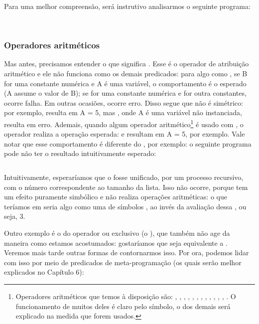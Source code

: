 \documentclass{article}
\begin{document}
Para uma melhor compreensão, será instrutivo analisarmos o seguinte programa:
\\
\\

\inputminted{prolog}{../Exemplos/Cap3/prog2_length.pl}\label{lst:length}

\subsubsection{Operadores aritméticos}

Mas antes, precisamos entender o que significa . Esse  é o operador de atribuição aritmético e ele não funciona como os demais predicados: para algo como , se B for uma constante numérica e A é uma variável, o comportamento é o esperado (A assume o valor de B); se  for uma constante numérica e  for outra constantes, ocorre falha. Em outras ocasiões, ocorre erro.
Disso segue que  não é simétrico: por exemplo,  resulta em A = 5, mas ,
onde A é uma variável não instanciada, resulta em erro. Ademais, quando algum
operador aritmético\footnote{Operadores aritméticos que temos à disposição são: ,
  , , , , , ,
  , , , , , . O
  funcionamento de muitos deles é claro pelo símbolo, o dos demais será explicado na medida que
  forem usados.}  é usado com , o operador realiza a operação esperada:
 e  resultam em A = 5, por exemplo. Vale notar que esse
comportamento é diferente do , por exemplo: o seguinte
programa pode não ter o resultado intuitivamente esperado:

\inputminted{prolog}{../Exemplos/Cap3/prog3_length1.pl}\label{lst:length1}

\noindent Intuitivamente, esperaríamos que o  fosse unificado, por um processo recursivo, com
o número correspondente ao tamanho da lista. Isso não ocorre, porque  tem um efeito puramente simbólico e não realiza operações aritméticas: o que teríamos em  seria algo como uma  de símbolos , ao invés da avaliação dessa , ou seja, 3.

Outro exemplo é o do operador ou exclusivo (o ), que também  não age da maneira como estamos acostumados: gostaríamos que  seja equivalente a .
Veremos mais tarde outras formas de contornarmos isso. Por ora, podemos lidar com isso por meio de predicados de meta-programação
(os quais serão melhor explicados no Capítulo 6):
\end{document}
